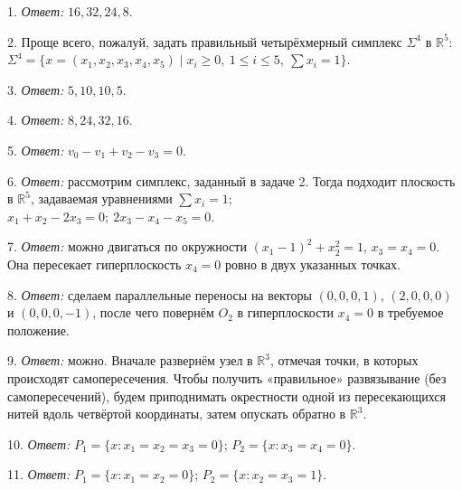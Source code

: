 	1. \textit{Ответ:} $16,32,24,8$.

	2. Проще всего, пожалуй, задать правильный четырёхмерный симплекс $\Sigma^4$ в $\mathbb{R}^5$:  
	$\Sigma^4 = \{ x = (x_1,x_2,x_3,x_4,x_5) \mid x_i \ge 0,\ 1 \le i \le 5,\ \sum x_i = 1 \}$.

	3. \textit{Ответ:} $5,10,10,5$.

	4. \textit{Ответ:} $8,24,32,16$.

	5. \textit{Ответ:} $v_0 - v_1 + v_2 - v_3 = 0$.

	6. \textit{Ответ:} рассмотрим симплекс, заданный в задаче 2. Тогда подходит плоскость в $\mathbb{R}^5$, задаваемая уравнениями  
	$\sum x_i = 1;$ \\$x_1 + x_2 - 2x_3 = 0;\ 2x_3 - x_4 - x_5 = 0$.

	7. \textit{Ответ:} можно двигаться по окружности $(x_1 - 1)^2 + x_2^2 = 1$, $x_3 = x_4 = 0$.  
	Она пересекает гиперплоскость $x_4 = 0$ ровно в двух указанных точках.

	8. \textit{Ответ:} сделаем параллельные переносы на векторы $(0,0,0,1)$, $(2,0,0,0)$ и $(0,0,0,-1)$, после чего повернём $O_2$ в гиперплоскости $x_4 = 0$ в требуемое положение.

	9. \textit{Ответ:} можно. Вначале развернём узел в $\mathbb{R}^3$, отмечая точки, в которых происходят самопересечения. Чтобы получить «правильное» развязывание (без самопересечений), будем приподнимать окрестности одной из пересекающихся нитей вдоль четвёртой координаты, затем опускать обратно в $\mathbb{R}^3$.

	10. \textit{Ответ:} $P_1 = \{x : x_1 = x_2 = x_3 = 0\}$; $P_2 = \{x : x_3 = x_4 = 0\}$.

	11. \textit{Ответ:} $P_1 = \{x : x_1 = x_2 = 0\}$; $P_2 = \{x : x_2 = x_3 = 1\}$.

